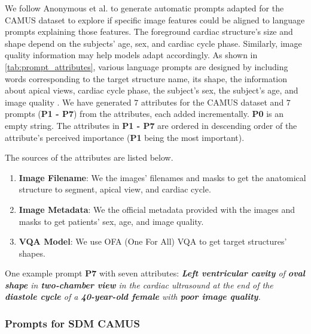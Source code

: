 \documentclass[runningheads]{llncs}
\begin{document}
We follow Anonymous et al. \cite{anon2023sup} to generate automatic prompts adapted for the CAMUS dataset to explore if specific image features could be aligned to language prompts explaining those features.
The foreground cardiac structure's size and shape depend on the subjects' age, sex, and cardiac cycle phase.
Similarly, image quality information may help models adapt accordingly. 
As shown in \cref{tab:prompt_attributes}, various language prompts are designed by including words corresponding to the target structure name, its shape, the information about apical views, cardiac cycle phase, the subject's sex, the subject's age, and image quality .
We have generated $7$ attributes for the CAMUS dataset and $7$ prompts (\textbf{P1 - P7}) from the attributes, each added incrementally.
\textbf{P0} is an empty string.
The attributes in \textbf{P1 - P7} are ordered in descending order of the attribute's perceived importance (\textbf{P1} being the most important).

The sources of the attributes are listed below.

\begin{enumerate}
    \item \textbf{Image Filename}: We  the images' filenames and masks to get the anatomical structure to segment, apical view, and cardiac cycle.
    \item \textbf{Image Metadata}: We  the official metadata provided with the images and masks to get patients' sex, age, and image quality.
    \item \textbf{VQA Model}: We use OFA (One For All) VQA \cite{wang2022ofa} to get target structures' shapes.
\end{enumerate}

One example prompt \textbf{P7} with seven attributes: \textit{\textbf{Left ventricular cavity} of \textbf{oval shape} in \textbf{two-chamber view} in the cardiac ultrasound at the end of the \textbf{diastole cycle} of a \textbf{40-year-old female} with \textbf{poor image quality}.}

\subsubsection{Prompts for SDM CAMUS}
\label{sec:prompt_eng_sdm}
\end{document}
